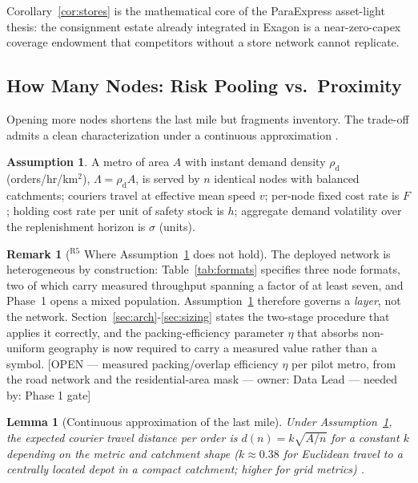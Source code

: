 \documentclass[10pt,twocolumn,letterpaper]{article}
\newtheorem{lemma}{Lemma}
\theoremstyle{definition}
\newtheorem{assumption}{Assumption}
\newtheorem{remark}{Remark}
\newcommand{\OPEN}[3]{{\color{openred}\footnotesize\textsf{[OPEN --- #1 --- owner: #2 --- needed by: #3]}}}
\begin{document}
Corollary~\ref{cor:stores} is the mathematical core of the ParaExpress asset-light thesis: the consignment estate already integrated in Exagon is a near-zero-capex coverage endowment that competitors without a store network cannot replicate.

\subsection{How Many Nodes: Risk Pooling vs.\ Proximity}

Opening more nodes shortens the last mile but fragments inventory. The trade-off admits a clean characterization under a continuous approximation \cite{eppen1979,daganzo1984}.

\begin{assumption}\label{as:uniform}
A metro of area $A$ with instant demand density $\rho_{\mathrm{d}}$ (orders/hr/km$^2$), $\Lambda=\rho_{\mathrm{d}}A$, is served by $n$ identical nodes with balanced catchments; couriers travel at effective mean speed $v$; per-node fixed cost rate is $F$; holding cost rate per unit of safety stock is $h$; aggregate demand volatility over the replenishment horizon is $\sigma$ (units).
\end{assumption}

\begin{remark}[$^{\mathrm{R5}}$ Where Assumption~\ref{as:uniform} does not hold]
The deployed network is heterogeneous by construction: Table~\ref{tab:formats} specifies three node formats, two of which carry measured throughput spanning a factor of at least seven, and Phase~1 opens a mixed population. Assumption~\ref{as:uniform} therefore governs a \emph{layer}, not the network. Section~\ref{sec:arch}-\ref{sec:sizing} states the two-stage procedure that applies it correctly, and the packing-efficiency parameter $\eta$ that absorbs non-uniform geography is now required to carry a measured value rather than a symbol. \OPEN{measured packing/overlap efficiency $\eta$ per pilot metro, from the road network and the residential-area mask}{Data Lead}{Phase 1 gate}
\end{remark}

\begin{lemma}[Continuous approximation of the last mile]\label{lem:lastmile}
Under Assumption~\ref{as:uniform}, the expected courier travel distance per order is $d(n)=k\sqrt{A/n}$ for a constant $k$ depending on the metric and catchment shape ($k\approx0.38$ for Euclidean travel to a centrally located depot in a compact catchment; higher for grid metrics) \cite{daganzo1984}.
\end{lemma}
\end{document}

